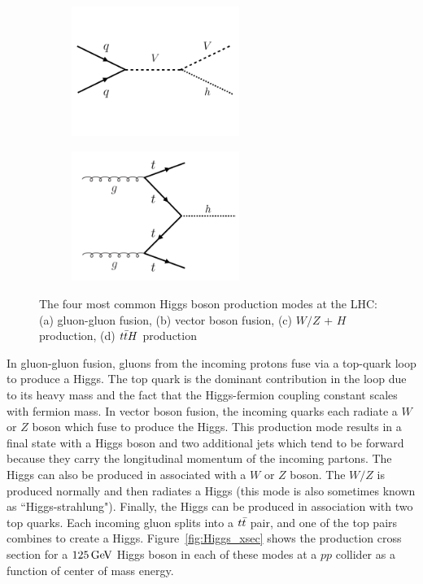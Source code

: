 \begin{figure}[h!]
    \begin{subfigure}[t]{0.5\textwidth}
        \centering
        \includegraphics[width=0.6\textwidth]{figures/V_higgs}
        \caption{}
    \end{subfigure}%
    \begin{subfigure}[t]{0.5\textwidth}
        \centering
        \includegraphics[width=0.6\textwidth]{figures/ttH}
        \caption{}
    \end{subfigure}

   \caption{The four most common Higgs boson production modes at the LHC: (a) gluon-gluon fusion, (b) vector boson fusion, (c) $W/Z$ + $H$ production, (d) $t\bar{t} H$ production}
  \label{fig:production_modes}
\end{figure}

In gluon-gluon fusion, gluons from the incoming protons fuse via a top-quark loop to produce a Higgs. The top quark is the dominant contribution in the loop due to its heavy mass and the fact that the Higgs-fermion coupling constant scales with fermion mass. In vector boson fusion, the incoming quarks each radiate a $W$ or $Z$ boson which fuse to produce the Higgs. This production mode results in a final state with a Higgs boson and two additional jets which tend to be forward because they carry the longitudinal momentum of the incoming partons. The Higgs can also be produced in associated with a $W$ or $Z$ boson. The $W/Z$ is produced normally and then radiates a Higgs (this mode is also sometimes known as ``Higgs-strahlung"). Finally, the Higgs can be produced in association with two top quarks. Each incoming gluon splits into a $t\bar{t}$ pair, and one of the top pairs combines to create a Higgs. Figure~\ref{fig:Higgs_xsec} shows the production cross section for a $125 \GeV$ Higgs boson in each of these modes at a $pp$ collider as a function of center of mass energy. 

